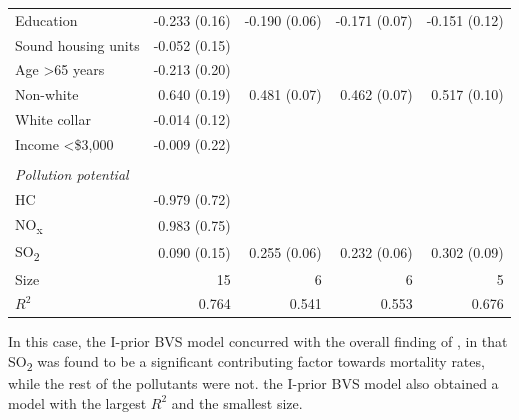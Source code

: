 \documentclass[a4paper,showframe,11pt]{report}
\begin{document}
\begin{table}[htbp]
\begin{tabular}{lrrrr}
\hspace{0.5em} Education                & {\color{gray} -0.233 (0.16)} & -0.190 (0.06)  & -0.171 (0.07)     & -0.151 (0.12)        \\
\hspace{0.5em} Sound housing units   & {\color{gray} -0.052 (0.15)} &                &                   &         \\
\hspace{0.5em} Age >65 years     & {\color{gray} -0.213 (0.20)} &                &                   &         \\
\hspace{0.5em} Non-white             & 0.640 (0.19)                 & 0.481 (0.07)   & 0.462 (0.07)      &  0.517 (0.10)       \\
\hspace{0.5em} White collar          & {\color{gray} -0.014 (0.12)} &                &                   &         \\
\hspace{0.5em} Income <\$3,000         & {\color{gray} -0.009 (0.22)} &                &                   &         \\
\\
\emph{Pollution potential} \\
\hspace{0.5em} HC    & {\color{gray} -0.979 (0.72)} &                &                   &         \\
\hspace{0.5em} NO\textsubscript{x} & {\color{gray} 0.983 (0.75)}  &                &                   &         \\
\hspace{0.5em}  SO\textsubscript{2} & {\color{gray} 0.090 (0.15)}  & 0.255 (0.06)   & 0.232 (0.06)      &  0.302 (0.09)        \\
\midrule
Size                     & 15                           & 6              & 6                 & 5         \\
$R^2$                    & 0.764                        & 0.541          & 0.553             & 0.676        \\ \bottomrule
\end{tabular}
\end{table}

In this case, the I-prior BVS model concurred with the overall finding of \citet{McDonald1973}, in that SO\textsubscript{2} was found to be a significant contributing factor towards mortality rates, while the rest of the pollutants were not.
the I-prior BVS model also obtained a model with the largest $R^2$ and the smallest size.
\end{document}

